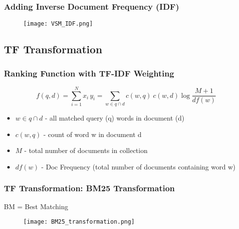 \subsubsection{Adding Inverse Document Frequency (IDF)}
\begin{figure}[H]
    \centering
    \texttt{[image: VSM\_IDF.png]}
\end{figure}


\subsection{TF Transformation}
\subsubsection{Ranking Function with TF-IDF Weighting}

\begin{equation*}
f(q, d) = \sum_{i=1}^N x_i \, y_i = \sum_{w \in q \cap d} c(w, q) \: c(w, d) \log \frac{M+1}{df(w)}
\end{equation*}

\begin{itemize}
\item $w \in q \cap d$ - all matched query (q) words in document (d)
\item $c(w, q)$ - count of word w in document d
\item $M$ - total number of documents in collection
\item $df(w)$ - Doc Frequency (total number of documents containing word w)
\end{itemize}



\subsubsection{TF Transformation: BM25 Transformation}
BM = Best Matching

\begin{figure}[H]
    \centering
    \texttt{[image: BM25\_transformation.png]}
\end{figure}



